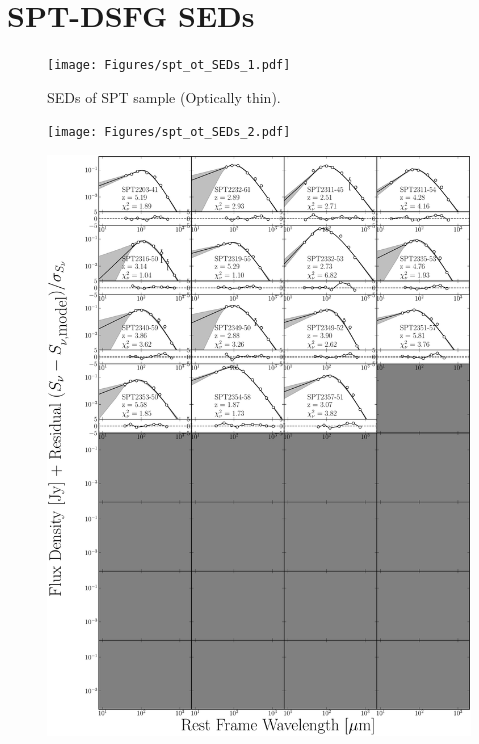 \chapter{SPT-DSFG SEDs}

\begin{figure}
	\centering
	\caption[SEDs of SPT sample (Optically thin)]{SEDs of SPT sample (Optically thin).}
	\texttt{[image: Figures/spt\_ot\_SEDs\_1.pdf]}
\end{figure}
\begin{figure}
	\centering
	\texttt{[image: Figures/spt\_ot\_SEDs\_2.pdf]}
\end{figure}
\begin{figure}
	\centering
	\includegraphics[width=\columnwidth]{Figures/spt_ot_SEDs_3.pdf}
\end{figure}


